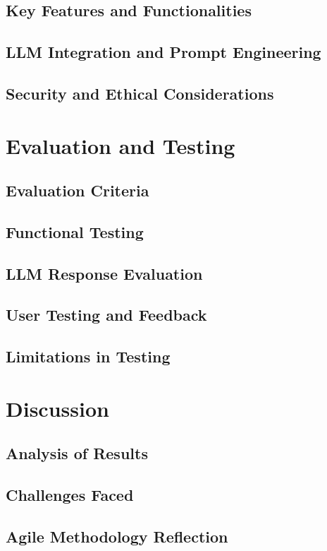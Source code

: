 \documentclass[12pt,a4paper]{report}
\begin{document}
\section{Key Features and Functionalities}
\section{LLM Integration and Prompt Engineering}
\section{Security and Ethical Considerations}

\chapter{Evaluation and Testing}  %
\section{Evaluation Criteria}
\section{Functional Testing}
\section{LLM Response Evaluation}
\section{User Testing and Feedback}
\section{Limitations in Testing}

\chapter{Discussion}  %
\section{Analysis of Results}
\section{Challenges Faced}
\section{Agile Methodology Reflection}
\end{document}

